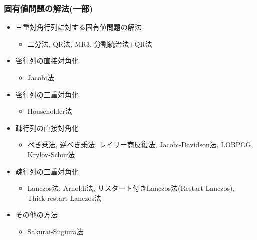 \begin{frame}
  \frametitle{固有値問題の解法(一部)}
  \begin{itemize}
  \item 三重対角行列に対する固有値問題の解法
    \begin{itemize}
      \item 二分法, QR法, MR3, 分割統治法+QR法
    \end{itemize}
  \item 密行列の直接対角化
    \begin{itemize}
      \item Jacobi法
    \end{itemize}
  \item 密行列の三重対角化
    \begin{itemize}
      \item Householder法
    \end{itemize}
  \item 疎行列の直接対角化
    \begin{itemize}
      \item べき乗法, 逆べき乗法, レイリー商反復法, Jacobi-Davidson法, LOBPCG, Krylov-Schur法
    \end{itemize}
  \item 疎行列の三重対角化
    \begin{itemize}
      \item Lanczos法, Arnoldi法, リスタート付きLanczos法(Restart Lanczos), Thick-restart Lanczos法
    \end{itemize}
  \item その他の方法
    \begin{itemize}
      \item Sakurai-Sugiura法
    \end{itemize}
  \end{itemize}
\end{frame}

